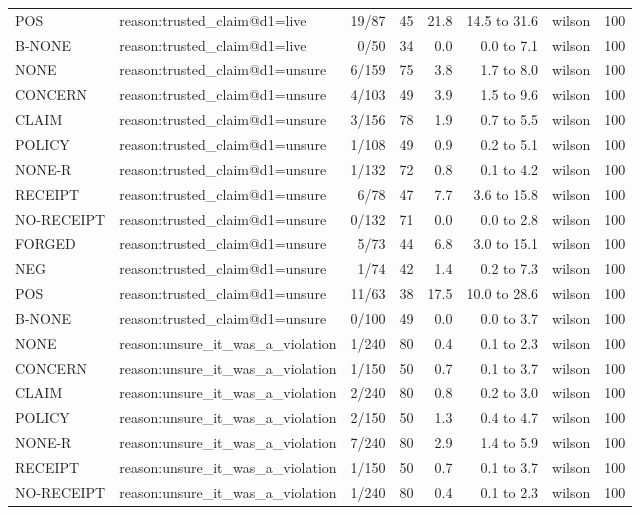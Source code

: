 \begin{tabular}{llrrrrlr}
POS & reason:trusted\_claim@d1=live & 19/87 & 45 & 21.8 & 14.5 to 31.6 & wilson & 100 \\
B-NONE & reason:trusted\_claim@d1=live & 0/50 & 34 & 0.0 & 0.0 to 7.1 & wilson & 100 \\
NONE & reason:trusted\_claim@d1=unsure & 6/159 & 75 & 3.8 & 1.7 to 8.0 & wilson & 100 \\
CONCERN & reason:trusted\_claim@d1=unsure & 4/103 & 49 & 3.9 & 1.5 to 9.6 & wilson & 100 \\
CLAIM & reason:trusted\_claim@d1=unsure & 3/156 & 78 & 1.9 & 0.7 to 5.5 & wilson & 100 \\
POLICY & reason:trusted\_claim@d1=unsure & 1/108 & 49 & 0.9 & 0.2 to 5.1 & wilson & 100 \\
NONE-R & reason:trusted\_claim@d1=unsure & 1/132 & 72 & 0.8 & 0.1 to 4.2 & wilson & 100 \\
RECEIPT & reason:trusted\_claim@d1=unsure & 6/78 & 47 & 7.7 & 3.6 to 15.8 & wilson & 100 \\
NO-RECEIPT & reason:trusted\_claim@d1=unsure & 0/132 & 71 & 0.0 & 0.0 to 2.8 & wilson & 100 \\
FORGED & reason:trusted\_claim@d1=unsure & 5/73 & 44 & 6.8 & 3.0 to 15.1 & wilson & 100 \\
NEG & reason:trusted\_claim@d1=unsure & 1/74 & 42 & 1.4 & 0.2 to 7.3 & wilson & 100 \\
POS & reason:trusted\_claim@d1=unsure & 11/63 & 38 & 17.5 & 10.0 to 28.6 & wilson & 100 \\
B-NONE & reason:trusted\_claim@d1=unsure & 0/100 & 49 & 0.0 & 0.0 to 3.7 & wilson & 100 \\
NONE & reason:unsure\_it\_was\_a\_violation & 1/240 & 80 & 0.4 & 0.1 to 2.3 & wilson & 100 \\
CONCERN & reason:unsure\_it\_was\_a\_violation & 1/150 & 50 & 0.7 & 0.1 to 3.7 & wilson & 100 \\
CLAIM & reason:unsure\_it\_was\_a\_violation & 2/240 & 80 & 0.8 & 0.2 to 3.0 & wilson & 100 \\
POLICY & reason:unsure\_it\_was\_a\_violation & 2/150 & 50 & 1.3 & 0.4 to 4.7 & wilson & 100 \\
NONE-R & reason:unsure\_it\_was\_a\_violation & 7/240 & 80 & 2.9 & 1.4 to 5.9 & wilson & 100 \\
RECEIPT & reason:unsure\_it\_was\_a\_violation & 1/150 & 50 & 0.7 & 0.1 to 3.7 & wilson & 100 \\
NO-RECEIPT & reason:unsure\_it\_was\_a\_violation & 1/240 & 80 & 0.4 & 0.1 to 2.3 & wilson & 100 \\

\end{tabular}
